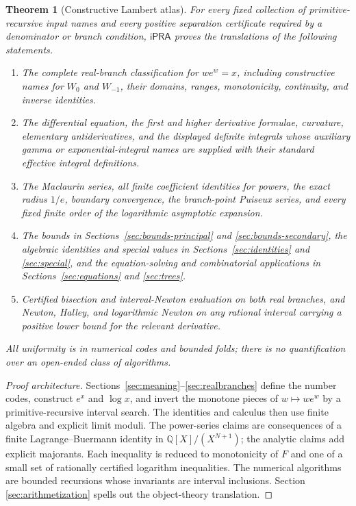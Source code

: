 \documentclass[11pt]{article}
\newtheorem{theorem}{Theorem}[section]
\theoremstyle{definition}
\newcommand{\Q}{\mathbb Q}
\newcommand{\iPRA}{\mathsf{iPRA}}
\begin{document}
\begin{theorem}[Constructive Lambert atlas]\label{thm:atlas}
For every fixed collection of primitive-recursive input names and every positive
separation certificate required by a denominator or branch condition, \(\iPRA\)
proves the translations of the following statements.
\begin{enumerate}
\item The complete real-branch classification for \(w e^w=x\), including
constructive names for \(W_0\) and \(W_{-1}\), their domains, ranges,
monotonicity, continuity, and inverse identities.
\item The differential equation, the first and higher derivative formulae,
curvature, elementary antiderivatives, and the displayed definite integrals
whose auxiliary gamma or exponential-integral names are supplied with their
standard effective integral definitions.
\item The Maclaurin series, all finite coefficient identities for powers, the
exact radius \(1/e\), boundary convergence, the branch-point Puiseux series,
and every fixed finite order of the logarithmic asymptotic expansion.
\item The bounds in Sections~\ref{sec:bounds-principal} and
\ref{sec:bounds-secondary}, the algebraic identities and special values in
Sections~\ref{sec:identities} and \ref{sec:special}, and the equation-solving
and combinatorial applications in Sections~\ref{sec:equations} and
\ref{sec:trees}.
\item Certified bisection and interval-Newton evaluation on both real branches,
and Newton, Halley, and logarithmic Newton on any rational interval carrying a
positive lower bound for the relevant derivative.
\end{enumerate}
All uniformity is in numerical codes and bounded folds; there is no
quantification over an open-ended class of algorithms.
\end{theorem}

\begin{proof}[Proof architecture]
Sections~\ref{sec:meaning}--\ref{sec:realbranches} define the number codes,
construct \(e^x\) and \(\log x\), and invert the monotone pieces of
\(w\mapsto we^w\) by a primitive-recursive interval search.  The identities and
calculus then use finite algebra and explicit limit moduli.  The power-series
claims are consequences of a finite Lagrange--Buermann identity in
\(\Q[X]/(X^{N+1})\); the analytic claims add explicit majorants.  Each
inequality is reduced to monotonicity of \(F\) and one of a small set of
rationally certified logarithm inequalities.  The numerical algorithms are
bounded recursions whose invariants are interval inclusions.  Section
\ref{sec:arithmetization} spells out the object-theory translation.
\end{proof}
\end{document}
